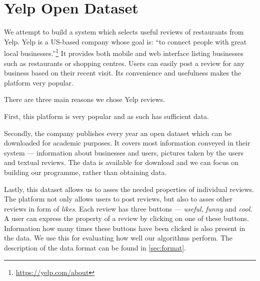\chapter{Yelp Open Dataset}

We attempt to build a system which selects useful reviews of restaurants from Yelp.
Yelp is a US-based company whose goal is: ``to connect people with great local businesses.''\footnote{\url{https://yelp.com/about}}
It provides both mobile and web interface listing businesses such as restaurants or shopping centres.
Users can easily post a review for any business based on their recent visit.
Its convenience and usefulness makes the platform very popular.

There are three main reasons we chose Yelp reviews.

First, this platform is very popular and as such has sufficient data.

Secondly, the company publishes every year an open dataset which can be downloaded for academic
purposes.
It covers most information conveyed in their system ---  information about businesses and users, pictures taken by the users and textual reviews.
The data is available for download and we can focus on building our programme, rather than obtaining data.

Lastly, this dataset allows us to asses the needed properties of individual reviews.
The platform not only allows users to post reviews, but also to asses other reviews in form of \emph{likes}.
Each review has three buttons --- \emph{useful}, \emph{funny} and \emph{cool}.
A user can express the property of a review by clicking on one of these buttons.
Information how many times these buttons have been clicked is also present in the data.
We use this for evaluating how well our algorithms perform.
The description of the data format can be found in \autoref{sec:format}.
